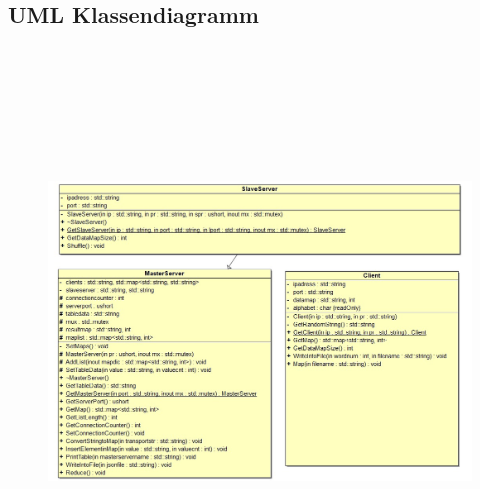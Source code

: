 \documentclass[a4paper,12pt]{article}
\begin{document}
\subsection{UML Klassendiagramm}
\:
\:
\begin{figure}[h]
    \centering
    \includegraphics[width=14cm, height=15cm]{uml.jpeg}
\end{figure}
\newpage
\end{document}

